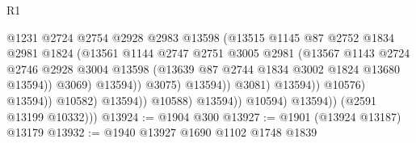 \begin{lexlean}{R1}
\begin{coremodule}
                                              @1231
                                              @2724
                                              @2754
                                              @2928
                                              @2983
                                              @13598
                                              (@13515
                                                @1145
                                                @87
                                                @2752
                                                @1834
                                                @2981
                                                @1824
                                                (@13561
                                                  @1144
                                                  @2747
                                                  @2751
                                                  @3005
                                                  @2981
                                                  (@13567
                                                    @1143
                                                    @2724
                                                    @2746
                                                    @2928
                                                    @3004
                                                    @13598
                                                    (@13639
                                                      @87
                                                      @2744
                                                      @1834
                                                      @3002
                                                      @1824
                                                      @13680
                                                      @13594))
                                                  @3069)
                                                @13594))
                                            @3075)
                                          @13594))
                                      @3081)
                                    @13594))
                                @10576)
                              @13594))
                          @10582)
                        @13594))
                    @10588)
                  @13594))
              @10594)
            @13594))
        (@2591 @13199 @10332)))
@13924 := @1904 @300
@13927 := @1901 (@13924 @13187) @13179
@13932 := @1940 @13927 @1690 @1102 @1748 @1839

\end{coremodule}
\end{lexlean}

